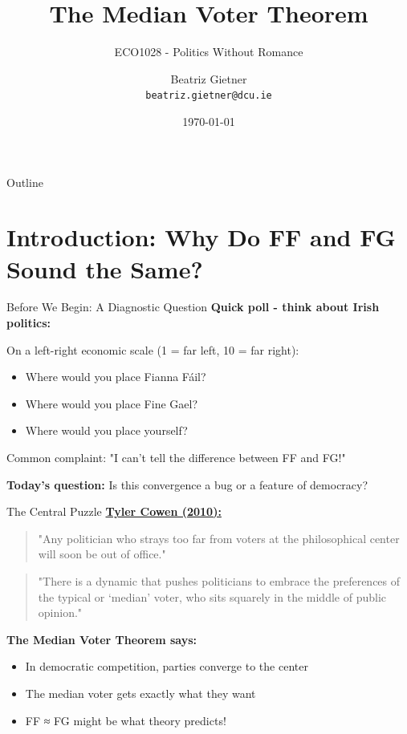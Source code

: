 \documentclass[10pt]{beamer}
\title{The Median Voter Theorem}
\subtitle{ECO1028 - Politics Without Romance}
\author{Beatriz Gietner\\
\texttt{beatriz.gietner@dcu.ie}}
\date{\today}
\begin{document}
\maketitle

\begin{frame}{Outline}
\tableofcontents
\end{frame}


\section{Introduction: Why Do FF and FG Sound the Same?}

\begin{frame}{Before We Begin: A Diagnostic Question}
\textbf{Quick poll - think about Irish politics:}


On a left-right economic scale (1 = far left, 10 = far right):
\begin{itemize}
\item Where would you place Fianna Fáil?
\item Where would you place Fine Gael?
\item Where would you place yourself?
\end{itemize}



\alert{Common complaint:} "I can't tell the difference between FF and FG!"



\textbf{Today's question:} Is this convergence a bug or a feature of democracy?
\end{frame}

\begin{frame}{The Central Puzzle}
\href{http://www.nytimes.com/2010/02/07/business/economy/07view.html}{\alert{\textbf{Tyler Cowen (2010):}}}


\begin{quote}
"Any politician who strays too far from voters at the philosophical center will soon be out of office."
\end{quote}



\begin{quote}
"There is a dynamic that pushes politicians to embrace the preferences of the typical or `median' voter, who sits squarely in the middle of public opinion."
\end{quote}



\textbf{The Median Voter Theorem says:}
\begin{itemize}
\item In democratic competition, parties converge to the center
\item The median voter gets exactly what they want
\item FF ≈ FG might be what theory predicts!
\end{itemize}
\end{frame}
\end{document}
